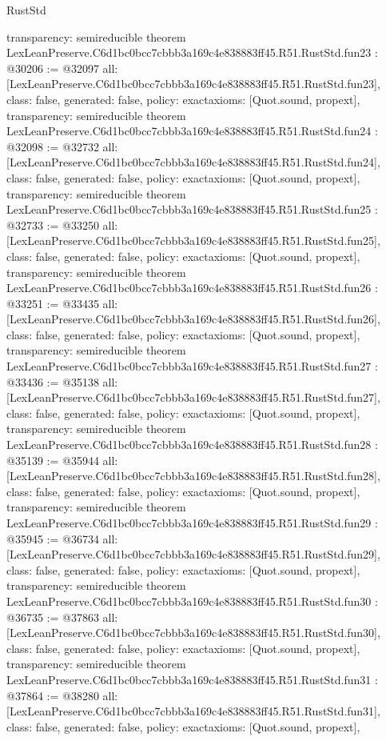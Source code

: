 \begin{lexlean}{RustStd}
\begin{coremodule}
{  transparency: semireducible
}
theorem LexLeanPreserve.C6d1bc0bcc7cbbb3a169c4e838883ff45.R51.RustStd.fun23 : @30206 := @32097 {
  all: [LexLeanPreserve.C6d1bc0bcc7cbbb3a169c4e838883ff45.R51.RustStd.fun23],
  class: false,
  generated: false,
  policy: exact{axioms: [Quot.sound, propext]},
  transparency: semireducible
}
theorem LexLeanPreserve.C6d1bc0bcc7cbbb3a169c4e838883ff45.R51.RustStd.fun24 : @32098 := @32732 {
  all: [LexLeanPreserve.C6d1bc0bcc7cbbb3a169c4e838883ff45.R51.RustStd.fun24],
  class: false,
  generated: false,
  policy: exact{axioms: [Quot.sound, propext]},
  transparency: semireducible
}
theorem LexLeanPreserve.C6d1bc0bcc7cbbb3a169c4e838883ff45.R51.RustStd.fun25 : @32733 := @33250 {
  all: [LexLeanPreserve.C6d1bc0bcc7cbbb3a169c4e838883ff45.R51.RustStd.fun25],
  class: false,
  generated: false,
  policy: exact{axioms: [Quot.sound, propext]},
  transparency: semireducible
}
theorem LexLeanPreserve.C6d1bc0bcc7cbbb3a169c4e838883ff45.R51.RustStd.fun26 : @33251 := @33435 {
  all: [LexLeanPreserve.C6d1bc0bcc7cbbb3a169c4e838883ff45.R51.RustStd.fun26],
  class: false,
  generated: false,
  policy: exact{axioms: [Quot.sound, propext]},
  transparency: semireducible
}
theorem LexLeanPreserve.C6d1bc0bcc7cbbb3a169c4e838883ff45.R51.RustStd.fun27 : @33436 := @35138 {
  all: [LexLeanPreserve.C6d1bc0bcc7cbbb3a169c4e838883ff45.R51.RustStd.fun27],
  class: false,
  generated: false,
  policy: exact{axioms: [Quot.sound, propext]},
  transparency: semireducible
}
theorem LexLeanPreserve.C6d1bc0bcc7cbbb3a169c4e838883ff45.R51.RustStd.fun28 : @35139 := @35944 {
  all: [LexLeanPreserve.C6d1bc0bcc7cbbb3a169c4e838883ff45.R51.RustStd.fun28],
  class: false,
  generated: false,
  policy: exact{axioms: [Quot.sound, propext]},
  transparency: semireducible
}
theorem LexLeanPreserve.C6d1bc0bcc7cbbb3a169c4e838883ff45.R51.RustStd.fun29 : @35945 := @36734 {
  all: [LexLeanPreserve.C6d1bc0bcc7cbbb3a169c4e838883ff45.R51.RustStd.fun29],
  class: false,
  generated: false,
  policy: exact{axioms: [Quot.sound, propext]},
  transparency: semireducible
}
theorem LexLeanPreserve.C6d1bc0bcc7cbbb3a169c4e838883ff45.R51.RustStd.fun30 : @36735 := @37863 {
  all: [LexLeanPreserve.C6d1bc0bcc7cbbb3a169c4e838883ff45.R51.RustStd.fun30],
  class: false,
  generated: false,
  policy: exact{axioms: [Quot.sound, propext]},
  transparency: semireducible
}
theorem LexLeanPreserve.C6d1bc0bcc7cbbb3a169c4e838883ff45.R51.RustStd.fun31 : @37864 := @38280 {
  all: [LexLeanPreserve.C6d1bc0bcc7cbbb3a169c4e838883ff45.R51.RustStd.fun31],
  class: false,
  generated: false,
  policy: exact{axioms: [Quot.sound, propext]},
}
\end{coremodule}
\end{lexlean}

